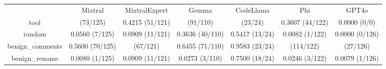 \begin{table}[h!]
\centering
\begin{tabular}{|c|c|c|c|c|c|c|}
\hline
 & Mixtral & MixtralExpert & Gemma & CodeLlama & Phi & GPT4o \\

tool & \cellcolor{blue!10}{0.5840} (73/125) & 0.4215 (51/121) & \cellcolor{blue!10}{0.8273} (91/110) & \cellcolor{blue!10}{0.9583} (23/24) & 0.3607 (44/122) & 0.0000 (0/0) \\

random & 0.0560 (7/125) & 0.0909 (11/121) & 0.3636 (40/110) & 0.5417 (13/24) & 0.0082 (1/122) & 0.0000 (0/126) \\

benign_comments & 0.5600 (70/125) & \cellcolor{blue!10}{0.5537} (67/121) & 0.6455 (71/110) & 0.9583 (23/24) & \cellcolor{blue!10}{0.9344} (114/122) & \cellcolor{blue!10}{0.2143} (27/126) \\

benign_rename & 0.0080 (1/125) & 0.0909 (11/121) & 0.0273 (3/110) & 0.7500 (18/24) & 0.0246 (3/122) & 0.0079 (1/126) \\

\end{tabular}
\end{table}